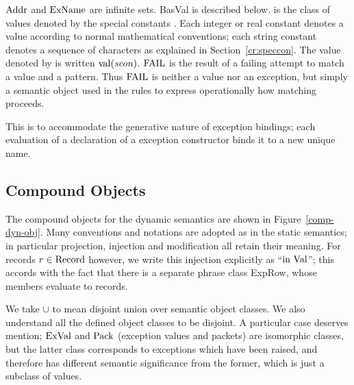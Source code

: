 ${\rm Addr}$ and ${\rm ExName}$ are infinite sets. BasVal is described below.
{\SVal} is the class of values denoted by the special constants
\SCon. Each integer or real constant denotes a value according to normal 
mathematical conventions; each string 
constant denotes a sequence of characters as explained in Section~\ref{cr:speccon}. The value denoted
by {\scon} is written $\mathop{\rm val}\nolimits({\it scon})$.
${\rm FAIL}$ is the result of a failing attempt to match a value and a
pattern. Thus ${\rm FAIL}$ is neither a value nor an exception, but simply
a semantic object used in the rules to express operationally
how matching proceeds.

This is to accommodate the generative
nature of exception bindings; each evaluation of a declaration of a
exception constructor binds it to a new unique name.

\subsection{Compound Objects}

The compound objects for the dynamic semantics are
shown in Figure~\ref{comp-dyn-obj}.
Many conventions and notations are adopted as in the static semantics; in
particular projection, injection and modification all retain
their meaning.   For records $r\in{\rm Record}$ however,
we write this injection explicitly as ``$\In\ \Val$''; this accords with
the fact that there is a separate phrase class ExpRow, whose members
evaluate to records. 

We take $\cup$ to mean disjoint union over
semantic object classes. We also understand all the defined object
classes to be disjoint. A particular case deserves mention; ${\rm ExVal}$
and ${\rm Pack}$ (exception values and packets) are isomorphic classes,
but the latter class corresponds to exceptions which have been
raised, and therefore has different semantic significance from the
former, which is just a subclass of values.


